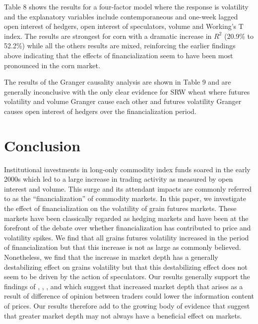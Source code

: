 \documentclass[12pt,]{article}
\begin{document}
Table 8 shows the results for a four-factor model where the response is
volatility and the explanatory variables include contemporaneous and
one-week lagged open interest of hedgers, open interest of speculators,
volume and Working's T index. The results are strongest for corn with a
dramatic increase in \(R^{2}\) (20.9\% to 52.2\%) while all the others
results are mixed, reinforcing the earlier findings above indicating
that the effects of financialization seem to have been most pronounced
in the corn market.

The results of the Granger causality analysis are shown in Table 9 and
are generally inconclusive with the only clear evidence for SRW wheat
where futures volatility and volume Granger cause each other and futures
volatility Granger causes open interest of hedgers over the
financialization period.

\newpage

\hypertarget{conclusions}{%
\section{Conclusion}\label{conclusions}}

Institutional investments in long-only commodity index funds soared in
the early 2000s which led to a large increase in trading activity as
measured by open interest and volume. This surge and its attendant
impacts are commonly referred to as the ``financialization'' of
commodity markets. In this paper, we investigate the effect of
financialization on the volatility of grain futures markets. These
markets have been classically regarded as hedging markets and have been
at the forefront of the debate over whether financialization has
contributed to price and volatility spikes. We find that all grains
futures volatility increased in the period of financialization but that
this increase is not as large as commonly believed. Nonetheless, we find
that the increase in market depth has a generally destabilizing effect
on grains volatility but that this destabilizing effect does not seem to
be driven by the action of speculators. Our results generally support
the findings of \citet{stein_informational_1987},
\citet{goldstein_speculation_2014}, \citet{singleton_investor_2013}, and
\citet{sockin_informational_2015} which suggest that increased market
depth that arises as a result of difference of opinion between traders
could lower the information content of prices. Our results therefore add
to the growing body of evidence that suggest that greater market depth
may not always have a beneficial effect on markets.

\newpage


\end{document}
